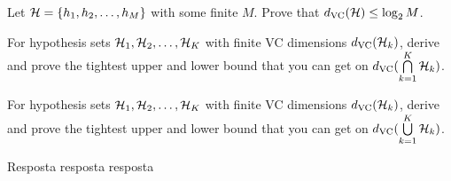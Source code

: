 \begin{enunciado}{13}
     Let $\mathcal{H} = \{h_1, h_2, \dots, h_M\}$ with
    some finite $M$. Prove that $d_{\text{VC}}(\mathcal{H}) \le \log_2 M$.
    
     For hypothesis sets $\mathcal{H}_1, \mathcal{H}_2, \dots, \mathcal{H}_K$ with finite VC dimensions $d_{\text{VC}}(\mathcal{H}_k)$, derive and prove the tightest upper and lower bound that you can get on $d_{\text{VC}}(\bigcap\limits_{k=1}^K \mathcal{H}_k)$.
    
     For hypothesis sets $\mathcal{H}_1, \mathcal{H}_2, \dots, \mathcal{H}_K$ with finite VC dimensions $d_{\text{VC}}(\mathcal{H}_k)$, derive and prove the tightest upper and lower bound that you can get on $d_{\text{VC}}(\bigcup\limits_{k=1}^K \mathcal{H}_k)$.
\end{enunciado}

Resposta resposta resposta